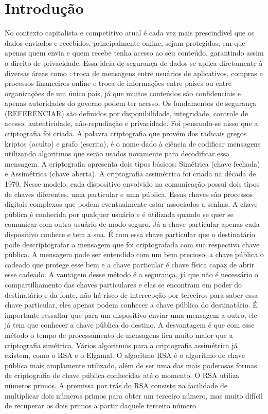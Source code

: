 \chapter{Introdução}

       No contexto capitalista e competitivo atual é cada vez mais prescindível que os dados enviados e recebidos, principalmente online, sejam protegidos, em que apenas quem envia e quem recebe tenha acesso ao seu conteúdo, garantindo assim o direito de privacidade. Essa ideia de segurança de dados se aplica diretamente à diversas áreas como : troca de mensagens entre usuários de aplicativos, compras e processos financeiros online e troca de informações entre países ou entre organizações de um único país, já que muitos conteúdos são confidenciais e apenas autoridades do governo podem ter acesso.  Os fundamentos de segurança (REFERENCIAR) são definidos por disponibilidade, integridade, controle de acesso, autenticidade, não-repudiação e privacidade. Foi pensando-se nisso que a criptografia foi criada. A palavra criptografia que provém dos radicais gregos kriptos (oculto) e grafo (escrita), é o nome dado à ciência de codificar mensagens utilizando algoritmos que serão usados novamente para decodificar essa mensagem. A criptografia apresenta dois tipos básicos: Simétrica (chave fechada) e Assimétrica (chave aberta).
   A criptografia assimétrica foi criada na década de 1970. Nesse modelo, cada dispositivo envolvido na comunicação possui dois tipos de chaves diferentes, uma particular e uma pública. Essas chaves são processos digitais complexos que podem eventualmente estar associados a senhas. A chave pública é conhecida por qualquer usuário e é utilizada quando se quer se comunicar com outro usuário de modo seguro. Já a chave particular apenas cada dispositivo conhece e tem a sua. É com essa chave particular que o destinatário pode descriptografar a mensagem que foi criptografada com sua respectiva chave pública. A mensagem pode ser entendido com um bem precioso, a chave pública o cadeado que protege esse bem e a chave particular é chave física capaz de abrir esse cadeado.
       A vantagem desse método é a segurança, já que não é necessário o compartilhamento das chaves particulares e elas se encontram em poder do destinatário e da fonte, não há risco de intercepção por terceiros para saber essa chave particular, eles apenas podem conhecer a chave pública do destinatário. É importante ressaltar que para um dispositivo enviar uma mensagem a outro, ele já tem que conhecer a chave pública do destino.  A desvantagem é que com esse método o tempo de processamento de mensagens fica muito maior que a criptografia simétrica. Vários algoritmos para a criptografia assimétrica já existem, como o RSA e o Elgamal. O algoritmo RSA é o algoritmo de chave pública mais amplamente utilizado, além de ser uma das mais poderosas formas de criptografia de chave pública conhecidas até o momento. O RSA utiliza números primos. A premissa por trás do RSA consiste na facilidade de multiplicar dois números primos para obter um terceiro número, mas muito difícil de recuperar os dois primos a partir daquele terceiro número
